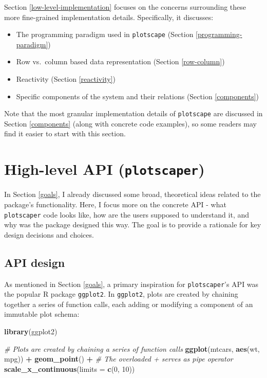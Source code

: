 \documentclass[
  openany]{book}
\newenvironment{Shaded}{\begin{snugshade}}{\end{snugshade}}
\newcommand{\AttributeTok}[1]{\textcolor[rgb]{0.13,0.29,0.53}{#1}}
\newcommand{\CommentTok}[1]{\textcolor[rgb]{0.56,0.35,0.01}{\textit{#1}}}
\newcommand{\DecValTok}[1]{\textcolor[rgb]{0.00,0.00,0.81}{#1}}
\newcommand{\FunctionTok}[1]{\textcolor[rgb]{0.13,0.29,0.53}{\textbf{#1}}}
\newcommand{\NormalTok}[1]{#1}
\newcommand{\SpecialCharTok}[1]{\textcolor[rgb]{0.81,0.36,0.00}{\textbf{#1}}}
\providecommand{\tightlist}{%
  \setlength{\itemsep}{0pt}\setlength{\parskip}{0pt}}
\theoremstyle{definition}
\theoremstyle{definition}
\theoremstyle{definition}
\theoremstyle{definition}
\theoremstyle{remark}
\begin{document}
Section \ref{low-level-implementation} focuses on the concerns surrounding these more fine-grained implementation details. Specifically, it discusses:

\begin{itemize}
\tightlist
\item
  The programming paradigm used in \texttt{plotscape} (Section \ref{programming-paradigm})
\item
  Row vs.~column based data representation (Section \ref{row-column})
\item
  Reactivity (Section \ref{reactivity})
\item
  Specific components of the system and their relations (Section \ref{components})
\end{itemize}

Note that the most granular implementation details of \texttt{plotscape} are discussed in Section \ref{components} (along with concrete code examples), so some readers may find it easier to start with this section.

\section{\texorpdfstring{High-level API (\texttt{plotscaper})}{High-level API (plotscaper)}}\label{high-level-api}

In Section \ref{goals}, I already discussed some broad, theoretical ideas related to the package's functionality. Here, I focus more on the concrete API - what \texttt{plotscaper} code looks like, how are the users supposed to understand it, and why was the package designed this way. The goal is to provide a rationale for key design decisions and choices.

\subsection{API design}\label{api-design}

As mentioned in Section \ref{goals}, a primary inspiration for \texttt{plotscaper}'s API was the popular R package \texttt{ggplot2}. In \texttt{ggplot2}, plots are created by chaining together a series of function calls, each adding or modifying a component of an immutable plot schema:

\begin{Shaded}
\begin{Highlighting}[]
\FunctionTok{library}\NormalTok{(ggplot2)}

\CommentTok{\# Plots are created by chaining a series of function calls}
\FunctionTok{ggplot}\NormalTok{(mtcars, }\FunctionTok{aes}\NormalTok{(wt, mpg)) }\SpecialCharTok{+}
  \FunctionTok{geom\_point}\NormalTok{() }\SpecialCharTok{+}   \CommentTok{\# The overloaded \textasciigrave{}+\textasciigrave{} serves as pipe operator}
  \FunctionTok{scale\_x\_continuous}\NormalTok{(}\AttributeTok{limits =} \FunctionTok{c}\NormalTok{(}\DecValTok{0}\NormalTok{, }\DecValTok{10}\NormalTok{))}
\end{Highlighting}
\end{Shaded}
\end{document}
